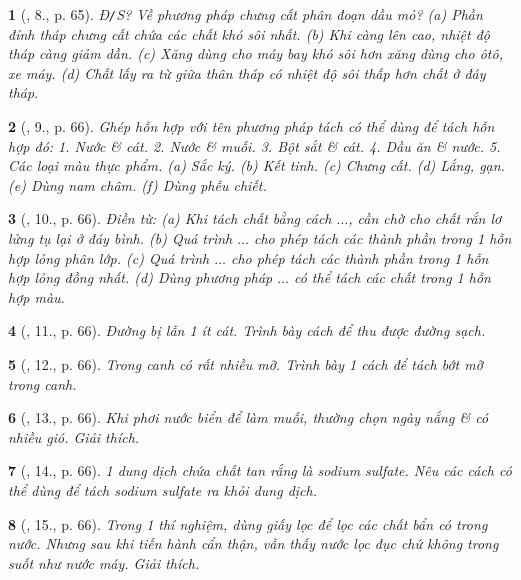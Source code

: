 \documentclass{article}
\newtheorem{baitoan}{}
\begin{document}
\begin{baitoan}[\cite{ncpt_KHTN_6_tap_1}, 8., p. 65]
	{\rm Đ{\tt/}S?} Về phương pháp chưng cất phân đoạn dầu mỏ? (a) Phần đỉnh tháp chưng cất chứa các chất khó sôi nhất. (b) Khi càng lên cao, nhiệt độ tháp càng giảm dần. (c) Xăng dùng cho máy bay khó sôi hơn xăng dùng cho ôtô, xe máy. (d) Chất lấy ra từ giữa thân tháp có nhiệt độ sôi thấp hơn chất ở đáy tháp.
\end{baitoan}

\begin{baitoan}[\cite{ncpt_KHTN_6_tap_1}, 9., p. 66]
	Ghép hỗn hợp với tên phương pháp tách có thể dùng để tách hỗn hợp đó: 1. Nước \& cát. 2. Nước \& muối. 3. Bột sắt \& cát. 4. Dầu ăn \& nước. 5. Các loại màu thực phẩm. (a) Sắc ký. (b) Kết tinh. (c) Chưng cất. (d) Lắng, gạn. (e) Dùng nam châm. (f) Dùng phễu chiết.
\end{baitoan}

\begin{baitoan}[\cite{ncpt_KHTN_6_tap_1}, 10., p. 66]
	Điền từ: (a) Khi tách chất bằng cách $\ldots$, cần chờ cho chất rắn lơ lửng tụ lại ở đáy bình. (b) Quá trình $\ldots$ cho phép tách các thành phần trong 1 hỗn hợp lỏng phân lớp. (c) Quá trình $\ldots$ cho phép tách các thành phần trong 1 hỗn hợp lỏng đồng nhất. (d) Dùng phương pháp $\ldots$ có thể tách các chất trong 1 hỗn hợp màu.
\end{baitoan}

\begin{baitoan}[\cite{ncpt_KHTN_6_tap_1}, 11., p. 66]
	Đường bị lẫn 1 ít cát. Trình bày cách để thu được đường sạch.
\end{baitoan}

\begin{baitoan}[\cite{ncpt_KHTN_6_tap_1}, 12., p. 66]
	Trong canh có rất nhiều mỡ. Trình bày 1 cách để tách bớt mỡ trong canh.
\end{baitoan}

\begin{baitoan}[\cite{ncpt_KHTN_6_tap_1}, 13., p. 66]
	Khi phơi nước biển để làm muối, thường chọn ngày nắng \& có nhiều gió. Giải thích.
\end{baitoan}

\begin{baitoan}[\cite{ncpt_KHTN_6_tap_1}, 14., p. 66]
	1 dung dịch chứa chất tan rắng là sodium sulfate. Nêu các cách có thể dùng để tách sodium sulfate ra khỏi dung dịch.
\end{baitoan}

\begin{baitoan}[\cite{ncpt_KHTN_6_tap_1}, 15., p. 66]
	Trong 1 thí nghiệm, dùng giấy lọc để lọc các chất bẩn có trong nước. Nhưng sau khi tiến hành cẩn thận, vẫn thấy nước lọc đục chứ không trong suốt như nước máy. Giải thích.
\end{baitoan}
\end{document}
